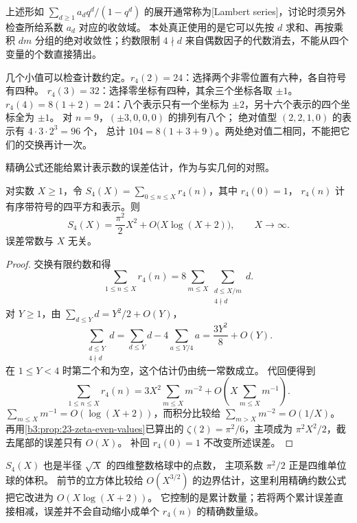 上述形如 \(\sum_{d\ge1} a_dq^d/(1-q^d)\) 的展开通常称为[Lambert series]，讨论时须另外检查所给系数 \(a_d\) 对应的收敛域。
本处真正使用的是它可以先按 \(d\) 求和、再按乘积 \(dm\) 分组的绝对收敛性；约数限制 \(4\nmid d\) 来自偶数因子的代数消去，不能从四个变量的个数直接猜出。

\ProseParagraphBreak
几个小值可以检查计数约定。\(r_4(2)=24\)：选择两个非零位置有六种，各自符号有四种。
\(r_4(3)=32\)：选择零坐标有四种，其余三个坐标各取 \(\pm1\)。
\(r_4(4)=8(1+2)=24\)：八个表示只有一个坐标为 \(\pm2\)，另十六个表示的四个坐标全为 \(\pm1\)。
对 \(n=9\)，\((\pm3,0,0,0)\) 的排列有八个；
绝对值型 \((2,2,1,0)\) 的表示有 \(4\cdot3\cdot2^3=96\) 个，
总计 \(104=8(1+3+9)\)。两处绝对值二相同，不能把它们的交换再计一次。

\ProseParagraphBreak
精确公式还能给累计表示数的误差估计，作为与实几何的对照。

\begin{proposition}[四平方和的累计计数]\label{b3:prop:24-four-square-average}
对实数 \(X\ge1\)，令
\(S_4(X)=\sum_{0\le n\le X}r_4(n)\)，其中 \(r_4(0)=1\)，
\(r_4(n)\) 计有序带符号的四平方和表示。则
\[
S_4(X)=\frac{\pi^2}{2}X^2+O\bigl(X\log(X+2)\bigr),
\qquad X\longrightarrow\infty.
\]
误差常数与 \(X\) 无关。
\end{proposition}
\begin{proof}
交换有限约数和得
\[
\sum_{1\le n\le X}r_4(n)
=8\sum_{m\le X}\sum_{\substack{d\le X/m\\4\nmid d}}d.
\]
对 \(Y\ge1\)，由 \(\sum_{d\le Y}d=Y^2/2+O(Y)\)，
\[
\sum_{\substack{d\le Y\\4\nmid d}}d
=\sum_{d\le Y}d-4\sum_{a\le Y/4}a
=\frac{3Y^2}{8}+O(Y).
\]
在 \(1\le Y<4\) 时第二个和为空，这个估计仍由统一常数成立。
代回便得到
\[
\sum_{1\le n\le X}r_4(n)
=3X^2\sum_{m\le X}m^{-2}
 +O\left(X\sum_{m\le X}m^{-1}\right).
\]
\(\sum_{m\le X}m^{-1}=O(\log(X+2))\)，而积分比较给
\(\sum_{m>X}m^{-2}=O(1/X)\)。
再用\cref{b3:prop:23-zeta-even-values}已算出的
\(\zeta(2)=\pi^2/6\)，主项成为 \(\pi^2X^2/2\)，截去尾部的误差只有 \(O(X)\)。
补回 \(r_4(0)=1\) 不改变所述误差。
\end{proof}

\(S_4(X)\) 也是半径 \(\sqrt X\) 的四维整数格球中的点数，
主项系数 \(\pi^2/2\) 正是四维单位球的体积。
前节的立方体比较给 \(O(X^{3/2})\) 的边界估计，这里利用精确约数公式把它改进为 \(O(X\log(X+2))\)。
它控制的是累计数量；若将两个累计误差直接相减，误差并不会自动缩小成单个 \(r_4(n)\) 的精确数量级。
